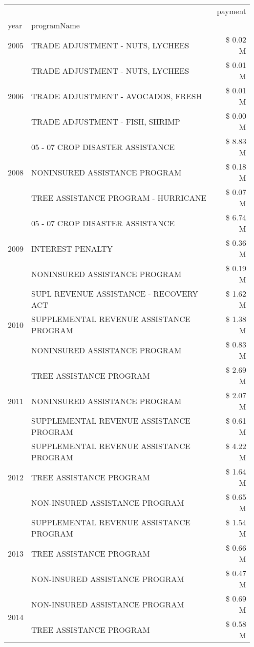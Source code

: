 \begin{tabular}{llr}
\toprule
 &  & payment \\
year & programName &  \\
\midrule
2005 & TRADE ADJUSTMENT - NUTS, LYCHEES & \$ 0.02 M \\
\cline{1-3}
\multirow[t]{3}{*}{2006} & TRADE ADJUSTMENT - NUTS, LYCHEES & \$ 0.01 M \\
 & TRADE ADJUSTMENT - AVOCADOS, FRESH & \$ 0.01 M \\
 & TRADE ADJUSTMENT - FISH, SHRIMP & \$ 0.00 M \\
\cline{1-3}
\multirow[t]{3}{*}{2008} & 05 - 07 CROP DISASTER ASSISTANCE & \$ 8.83 M \\
 & NONINSURED ASSISTANCE PROGRAM & \$ 0.18 M \\
 & TREE ASSISTANCE PROGRAM - HURRICANE & \$ 0.07 M \\
\cline{1-3}
\multirow[t]{3}{*}{2009} & 05 - 07 CROP DISASTER ASSISTANCE & \$ 6.74 M \\
 & INTEREST PENALTY & \$ 0.36 M \\
 & NONINSURED ASSISTANCE PROGRAM & \$ 0.19 M \\
\cline{1-3}
\multirow[t]{3}{*}{2010} & SUPL REVENUE ASSISTANCE - RECOVERY ACT & \$ 1.62 M \\
 & SUPPLEMENTAL REVENUE ASSISTANCE PROGRAM & \$ 1.38 M \\
 & NONINSURED ASSISTANCE PROGRAM & \$ 0.83 M \\
\cline{1-3}
\multirow[t]{3}{*}{2011} & TREE ASSISTANCE PROGRAM & \$ 2.69 M \\
 & NONINSURED ASSISTANCE PROGRAM & \$ 2.07 M \\
 & SUPPLEMENTAL REVENUE ASSISTANCE PROGRAM & \$ 0.61 M \\
\cline{1-3}
\multirow[t]{3}{*}{2012} & SUPPLEMENTAL REVENUE ASSISTANCE PROGRAM & \$ 4.22 M \\
 & TREE ASSISTANCE PROGRAM & \$ 1.64 M \\
 & NON-INSURED ASSISTANCE PROGRAM & \$ 0.65 M \\
\cline{1-3}
\multirow[t]{3}{*}{2013} & SUPPLEMENTAL REVENUE ASSISTANCE PROGRAM & \$ 1.54 M \\
 & TREE ASSISTANCE PROGRAM & \$ 0.66 M \\
 & NON-INSURED ASSISTANCE PROGRAM & \$ 0.47 M \\
\cline{1-3}
\multirow[t]{3}{*}{2014} & NON-INSURED ASSISTANCE PROGRAM & \$ 0.69 M \\
 & TREE ASSISTANCE PROGRAM & \$ 0.58 M \\

\end{tabular}

